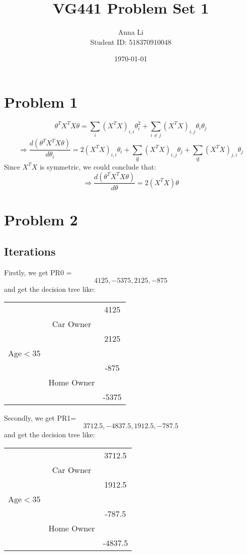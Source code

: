 \documentclass[a4paper,12pt]{journal}
\title{VG441 Problem Set 1}
\author{Anna Li \\Student ID: 518370910048}
\date{\today}
\begin{document}
	\maketitle
	\section*{Problem 1}
		$$\theta^TX^TX\theta=\sum_{i}(X^TX)_{i,i}\theta_i^2+\sum_{i\not =j}(X^TX)_{i,j}\theta_i\theta_j$$
	$$\Rightarrow \frac{d(\theta^TX^TX\theta)}{d\theta_i}=2(X^TX)_{i,i}\theta_i+\sum_{i\not j}(X^TX)_{i,j}\theta_j+\sum_{i\not j}(X^TX)_{j,i}\theta_j$$
	Since $X^TX$ is symmetric, we could conclude that:
	$$\Rightarrow \frac{d(\theta^TX^TX\theta)}{d\theta}=2(X^TX)\theta$$
	\section*{Problem 2}
	\subsection*{Iterations}
	Firstly, we get PR0 = \[4125,-5375,2125,-875\] and get the decision tree like:
	\begin{center}
		\begin{tabular}{c c c}
			&&4125\\
			&Car Owner&\\
			&&2125\\
			Age$<$35&&\\
			&&-875\\
			&Home Owner&\\
			&&-5375\\
		\end{tabular}
	\end{center}
Secondly, we get PR1=\[3712.5,-4837.5,1912.5,-787.5\] and get the decision tree like:
	\begin{center}
	\begin{tabular}{c c c}
		&&3712.5\\
		&Car Owner&\\
		&&1912.5\\
		Age$<$35&&\\
		&&-787.5\\
		&Home Owner&\\
		&&-4837.5\\
	\end{tabular}
\end{center}
\end{document}
